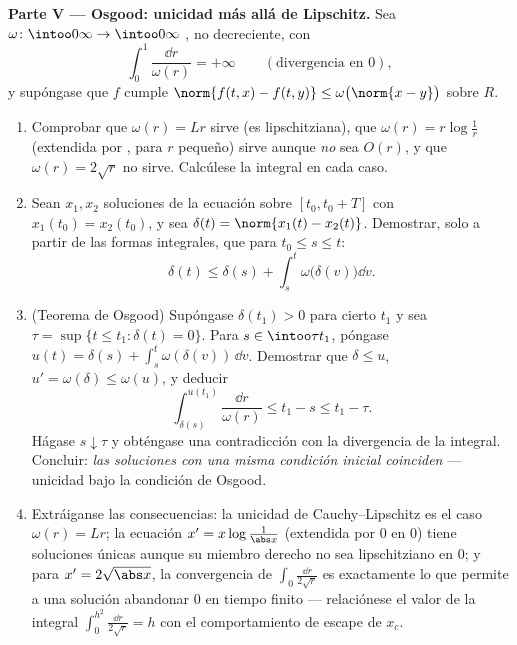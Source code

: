 \begin{problem}[{Problema de fin de semana --- existencia de soluciones
de
$x' = f(t, x)$ sin hipótesis de Lipschitz}]
\medskip
\noindent\textbf{Parte V --- Osgood: unicidad más allá de Lipschitz.}
Sea $\omega\colon\intoo0\infty\to\intoo0\infty$
, no decreciente, con
\[
\int_0^1\frac{\dd r}{\omega(r)} = +\infty
\qquad(\text{divergencia en } 0),
\]
y supóngase que $f$ cumple $\norm{f(t, x) - f(t, y)} \leq
\omega\bigl(\norm{x - y}\bigr)$ sobre $R$.
\begin{enumerate}[resume]
  \item Comprobar que $\omega(r) = Lr$ sirve (es lipschitziana), que
  $\omega(r) = r\log\frac1r$ (extendida por
  , para $r$ pequeño)
  sirve aunque \emph{no} sea $O(r)$, y que $\omega(r) = 2\sqrt r$ no
  sirve. Calcúlese la integral en cada caso. \item Sean $x_1, x_2$
  soluciones de la ecuación sobre $[t_0, t_0 + T]$ con
  $x_1(t_0) = x_2(t_0)$, y sea $\delta(t) =
        \norm{x_1(t) - x_2(t)}$. Demostrar, solo a partir de las formas
  integrales, que para $t_0 \leq s \leq t$:
        \[
        \delta(t) \leq \delta(s) +
        \int_s^t\omega\bigl(\delta(v)\bigr)\dd v .
        \]
  \item (Teorema de Osgood) Supóngase $\delta(t_1) > 0$ para cierto
  $t_1$ y sea $\tau = \sup\{t \leq t_1 : \delta(t) =
        0\}$. Para $s \in \intoo\tau{t_1}$, póngase $u(t) = \delta(s)
        + \int_s^t\omega(\delta(v))\,\dd v$. Demostrar que $\delta \leq
        u$, $u' = \omega(\delta) \leq \omega(u)$, y deducir
        \[
        \int_{\delta(s)}^{u(t_1)}\frac{\dd r}{\omega(r)}
        \leq t_1 - s \leq t_1 - \tau .
        \]
        Hágase $s \downarrow \tau$ y obténgase una contradicción con la
        divergencia de la integral. Concluir: \emph{las soluciones con
        una misma condición inicial coinciden} --- unicidad bajo la
        condición de Osgood. \item Extráiganse las consecuencias: la
        unicidad de Cauchy--Lipschitz es el caso $\omega(r) = Lr$; la
        ecuación $x' =
        x\log\frac1{\abs x}$ (extendida por $0$ en $0$) tiene soluciones
        únicas aunque su miembro derecho no sea lipschitziano en $0$; y
        para $x' = 2\sqrt{\abs x}$, la convergencia de
        $\int_0\frac{\dd r}{2\sqrt r}$ es exactamente lo que permite a
        una solución abandonar $0$ en tiempo finito --- relaciónese el
        valor de la integral $\int_0^{h^2}\frac{\dd r}{2\sqrt r} = h$
        con el comportamiento de escape de $x_c$.
\end{enumerate}


\end{problem}
